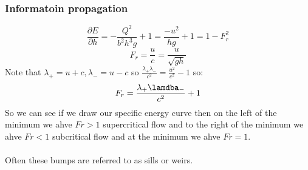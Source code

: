 \documentclass{article}
\begin{document}
 \subsubsection{Informatoin propagation}
 $$
  \frac{\partial E}{\partial h} = - \frac{Q^2}{b^2 h^3 g} + 1 = \frac{- u^2}{hg} +1 = 1 - F_r^2
 $$
 $$
  F_r = \frac{u}{c} = \frac{u}{\sqrt{gh}}
 $$
 Note that $\lambda_+ = u +c, \lambda_- = u -c$ so $\frac{\lambda_+ \lambda_-}{c^2} = \frac{u^2}{c^2} - 1$ so:
 $$
  F_r = \frac{\lambda_+ \lamdba_-}{c^2} +1
 $$
 So we can see if we draw our specific energy curve then on the left of the minimum we ahve $Fr>1$ supercritical flow and to the right of the minimum we ahve $Fr<1$ subcritical flow and at the minimum we ahve $Fr=1$.\\\\
Often these bumps are referred to as sills or weirs.
\end{document}
